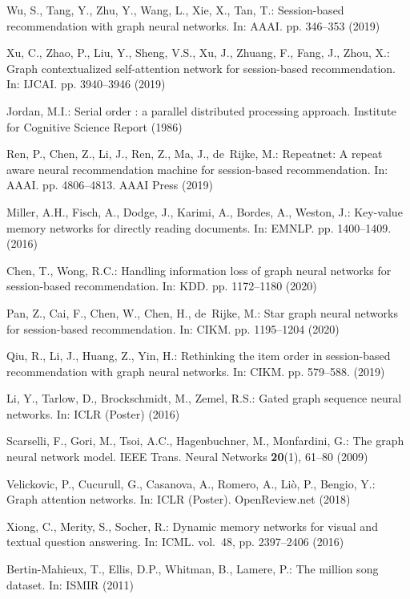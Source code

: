 \documentclass[runningheads]{llncs}
\begin{document}
\begin{thebibliography}{8}
Wu, S., Tang, Y., Zhu, Y., Wang, L., Xie, X., Tan, T.: Session-based
recommendation with graph neural networks. In: {AAAI}. pp. 346--353  (2019)

Xu, C., Zhao, P., Liu, Y., Sheng, V.S., Xu, J., Zhuang, F., Fang, J., Zhou, X.:
Graph contextualized self-attention network for session-based recommendation.
In: {IJCAI}. pp. 3940--3946 (2019)


Jordan, M.I.: Serial order : a parallel distributed processing approach.
Institute for Cognitive Science Report  (1986)

Ren, P., Chen, Z., Li, J., Ren, Z., Ma, J., de~Rijke, M.: Repeatnet: {A} repeat
aware neural recommendation machine for session-based recommendation. In:
{AAAI}. pp. 4806--4813. {AAAI} Press (2019)


Miller, A.H., Fisch, A., Dodge, J., Karimi, A., Bordes, A., Weston, J.:
  Key-value memory networks for directly reading documents. In: {EMNLP}. pp.
  1400--1409.  (2016)
  


Chen, T., Wong, R.C.: Handling information loss of graph neural networks for
session-based recommendation. In: {KDD}. pp. 1172--1180 (2020)

  
Pan, Z., Cai, F., Chen, W., Chen, H., de~Rijke, M.: Star graph neural networks
for session-based recommendation. In: {CIKM}. pp. 1195--1204 (2020)


Qiu, R., Li, J., Huang, Z., Yin, H.: Rethinking the item order in session-based
  recommendation with graph neural networks. In: {CIKM}. pp. 579--588.  
  (2019)

  
Li, Y., Tarlow, D., Brockschmidt, M., Zemel, R.S.: Gated graph sequence neural
networks. In: {ICLR} (Poster) (2016)

  
Scarselli, F., Gori, M., Tsoi, A.C., Hagenbuchner, M., Monfardini, G.: The
  graph neural network model. {IEEE} Trans. Neural Networks  \textbf{20}(1),
  61--80 (2009)
  
  
Velickovic, P., Cucurull, G., Casanova, A., Romero, A., Li{\`{o}}, P., Bengio,
Y.: Graph attention networks. In: {ICLR} (Poster). OpenReview.net (2018)




Xiong, C., Merity, S., Socher, R.: Dynamic memory networks for visual and
textual question answering. In: {ICML}. vol.~48, pp. 2397--2406 (2016)


Bertin-Mahieux, T., Ellis, D.P., Whitman, B., Lamere, P.: The million song
dataset. In: {ISMIR} (2011)

  
  \end{thebibliography}

  
\end{document}
